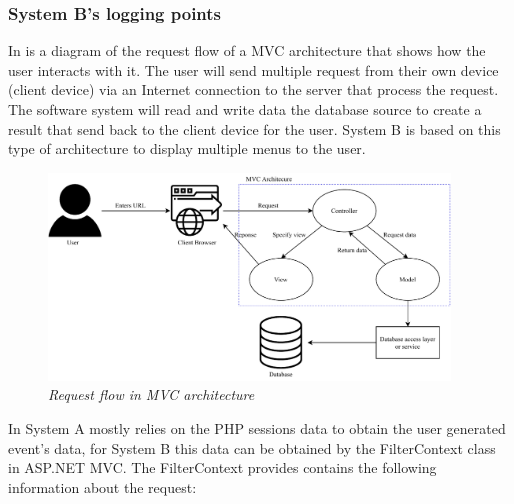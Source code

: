 \subsubsection{System B's logging points}

In  is a diagram of the request flow of a MVC architecture that shows how the user interacts with it. The user will send multiple request from their own device (client device) via an Internet connection to the server that process the request. The software system will read and write data the database source to create a result that send back to the client device for the user. System B is based on this type of architecture to display multiple menus to the user. 

\begin{figure}[!htb] %
	\centering %
	\includegraphics[width=0.95\textwidth]{Images/Chapter2/Flow_MVC_Architecture/Flow_MVC_Architecture.pdf}
	\caption[Request flow in MVC architecture]
	{\textit{Request flow in MVC architecture \cite{Gu2010}}}\label{fig:ch2_Flow_MVC_Architecture}
\end{figure}

In  System A mostly relies on the PHP sessions data to obtain the user generated event's data, for System B this data can be obtained by the FilterContext class in ASP.NET MVC. The FilterContext provides contains the following information about the request:

